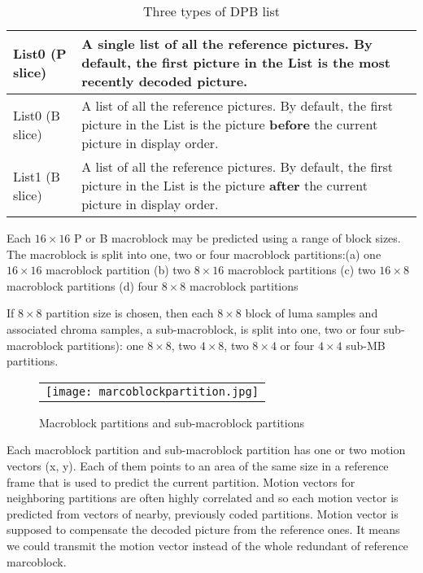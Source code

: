 \documentclass[../main.tex]{subfiles}
\begin{document}
\begin{table}[ht]
\label{tab:list}
\begin{center}       
\begin{tabular}{|l|p{10cm}|} 
\hline
\rule[-1ex]{0pt}{3.5ex}  List0 (P slice) & A single list of all the reference pictures.  By default, the first picture in
the List is the most recently decoded picture.\\  
\hline
\rule[-1ex]{0pt}{3.5ex}  List0 (B slice) & A list of all the reference pictures. By default, the first picture in the List
is the picture \textbf {before} the current picture in display order.   \\
\hline
\rule[-1ex]{0pt}{3.5ex}  List1 (B slice) & A list of all the reference pictures. By default, the first picture in the List
is the picture \textbf {after} the current picture in display order.  \\
\hline

\end{tabular}
\end{center}
\caption{Three types of DPB list} 
\end{table}

Each $16 \times 16$ P or B macroblock may be predicted using a range
of block sizes. The macroblock is split into one, two or four
macroblock partitions:(a) one $16 \times 16$ macroblock partition (b) two $8 \times 16$ macroblock partitions
(c) two $16 \times 8$ macroblock partitions (d) four $8 \times 8$ macroblock partitions

If $8 \times 8$ partition size is chosen, then each $8 \times 8$ block of luma samples and associated chroma
samples, a sub-macroblock, is split into one, two or four sub-macroblock partitions): one
$8 \times 8$, two $4 \times 8$, two $8 \times 4$ or four $4 \times 4$ sub-MB partitions.

\begin{figure} [ht]
   \begin{center}
   \begin{tabular}{c} %
   \texttt{[image: marcoblockpartition.jpg]}
   \end{tabular}
   \end{center}
   \caption[mbpart] 
   { \label{fig:mbpart} 
Macroblock partitions and sub-macroblock partitions}
   \end{figure}     %
   
Each macroblock partition and sub-macroblock partition has one or two motion vectors (x, y). Each of them points to an area of the same size in a reference frame that is used to predict the current partition. Motion vectors for neighboring partitions are often highly correlated and so each motion vector is predicted from vectors of nearby, previously coded partitions. Motion vector is supposed to compensate the decoded picture from the reference ones. It means we could transmit the motion vector instead of the whole redundant of reference marcoblock.
\end{document}

